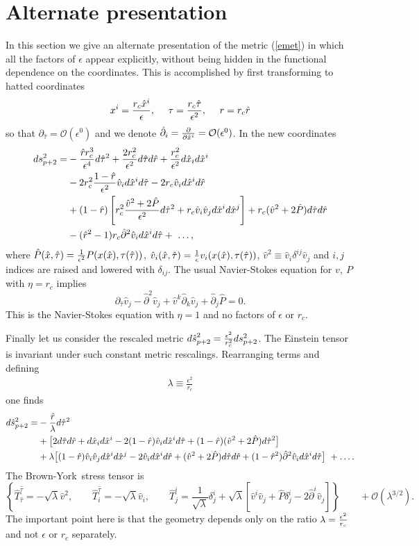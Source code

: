 \documentclass{article}
\def\beq{\begin{equation}}
\def\eeq{\end{equation}}
\def\ba{\beq\begin{array}{l}}
\def\ea{\end{array}\eeq}
\def\be{\ba}
\def\ee{\ea}
\def\p{\partial}
\def\d{{\delta}}
\def\t{{ \theta}}
\def\e{{\epsilon}}
\def\v{{\varphi}}
\def\cO{\mathcal{O}}
\def\x{\hat x}
\def\P{\hat P}
\def\q{\hat q}
\def\r{\hat r}
\def\t{\hat \tau}
\def\v{\hat v}
\def\brownyork{Brown-York}
\begin{document}
\section{Alternate presentation}
In this section we give an alternate presentation of the  metric (\ref{emet}) in which all the factors of $\e$ appear explicitly, without being hidden in the functional dependence on the coordinates. This is accomplished by first transforming to hatted coordinates
%
\beq
{x^i }  ={r_c \x^i \over \e}, ~~~~ \tau= { r_c \t \over \e^2}, ~~~~r= r_c\r
\eeq
%
so that $\p_{\t }=\cO(\e^0)$ and we denote $\hat \p_i={\p \over \p \x^i}=\cO(\e^0)$. In the new coordinates
%
\begin{align}
ds_{p+2}^2 =&-\frac{\r  r_c^3}{\e^4} d\t^2 + \frac{2r_c^2}{ \e^2} d\t d\r + \frac{r_c^2 }{ \e^2}d\x_i d\x^i \notag\\
&-2 r_c^2\frac{1-\r}{\e^2}\v_i d\x^i d\t -2 r_c{\v_i}d\x^i d\r \label{emts}\\
&+{(1-\r)}\left[r_c^2 \frac{ \v^2+2\P}{\e^2} d\t^2 + r_c{\v_i \v_j }d\x^i d\x^j \right]  + r_c(\v^2+2\P)d\t d\r \notag\\
&-( \r^2-1)r_c \hat \p^2 \v_i d\x^i d\t +~\ldots,
\end{align}
where $\P(\x,\t)={1 \over\e^2}P(x(\x),\tau(\t))$, $\v_i(\x,\t)={1\over \e}v_i(x(\x),\tau(\t))$,
$\v^2\equiv \v_i\d^{ij}\v_j$ and $i,j$ indices are raised and lowered with $\d_{ij}$.  The usual Navier-Stokes equation for $v,~P$ with $\eta=r_c$ implies
%
\beq
\p_{\t} \v_j-\hat \p^2\v_j+\v^k\hat \p_k\v_j+ \hat \p_j\P =0.
\eeq
%
This is the Navier-Stokes equation with $\eta=1$ and no factors of $\e$ or  $r_c$.

Finally let us consider the rescaled metric ${d\hat s}_{p+2}^2={\e^2 \over r_c^2} ds_{p+2}^2$.
The Einstein tensor is invariant under such constant metric rescalings. Rearranging terms and defining
\be \lambda\equiv \frac{ \e^2}{r_c} \ee
one finds
%
\begin{align}
d\hat s_{p+2}^2 =&-{\r \over \lambda} d\t^2 \notag\\
&+\bigl[2d\t d\r + d\x_i d\x^i-2 (1-\r)\v_i d\x^i d\t +{(1-\r)} ( \v^2+2\P) d\t^2 \bigr]  \label{mts}\\
&+\lambda\bigl[(1-\r){\v_i \v_j }d\x^i d\x^j   -2 {\v_i}d\x^i d\r + (\v^2+2\P)d\t d\r +(1-\r^2)\hat \p^2 \v_i d\x^i d\t
\bigr]
~+\ldots.\notag
\end{align}
%
The \brownyork\ stress tensor is
%
\beq
\left\{\hat T^{\t}_{\t} = - \sqrt{\lambda} \v^2 ,\qquad \hat T^{\t}_i = - \sqrt{\lambda} \v_i,\qquad \hat T^i_j = \frac{1}{\sqrt{\lambda}}\delta^i_j  + \sqrt{\lambda} \left[ \v^i \v_j + \P \delta^i_j - 2\hat \p^i \v_j  \right]\right\}\qquad + \cO(\lambda^{3/2} ).
\eeq
%
The important point here is that the geometry depends only on the ratio $\lambda={\e^2\over r_c}$ and not $\e$ or $r_c$ separately.
\end{document}
